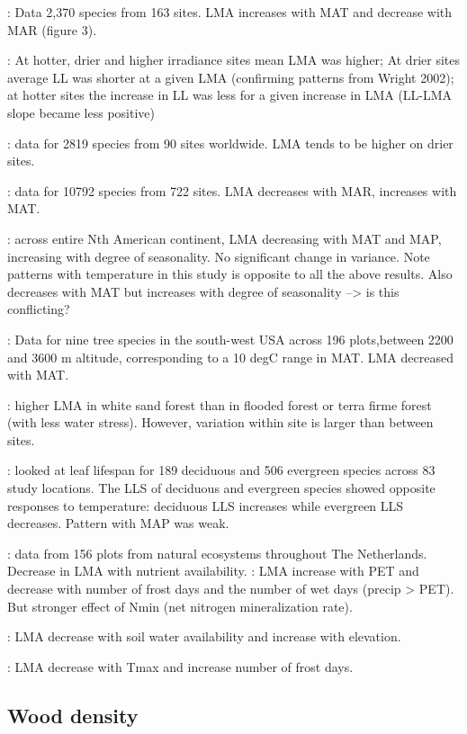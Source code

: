 \documentclass[a4paper,11pt]{article}
\begin{document}
\citet{Wright-2004}: Data 2,370 species from 163 sites. LMA increases with MAT and decrease with MAR (figure 3).

\citet{Wright-2005}: At hotter, drier and higher irradiance sites mean LMA was higher; At drier sites average LL was shorter at a given LMA (confirming patterns from Wright 2002); at hotter sites the increase in LL was less for a given increase in LMA (LL-LMA slope became less positive)

\citet{Onoda-2011}: data for 2819 species from 90 sites worldwide. LMA tends to be higher on drier sites.

\citet{Moles-2014}: data for 10792 species from 722 sites. LMA decreases with MAR, increases with MAT.

\citet{Simova-2014}: across entire Nth American continent, LMA decreasing with MAT and MAP, increasing with degree of seasonality. No significant change in variance. Note patterns with temperature in this study is opposite to all the above results. Also decreases with MAT but increases with degree of seasonality --> is this conflicting?

\citet{Laughlin-2012}: Data for nine tree species in the south-west USA across 196 plots,between 2200 and 3600 m altitude, corresponding to a 10 degC range in MAT. LMA decreased with MAT.

\citet{Fortunel-2014}: higher LMA  in white sand forest than in flooded forest or terra firme forest (with less water stress). However, variation within site is larger than between sites.

\citet{vanOmmenKloeke-2012}: looked at leaf lifespan for 189 deciduous and 506 evergreen species across 83 study locations. The LLS of deciduous and evergreen species showed opposite responses to temperature: deciduous LLS increases while evergreen LLS decreases. Pattern with MAP was weak.

\citet{Douma-2011}: data from 156 plots from natural ecosystems throughout The Netherlands.  Decrease in LMA with nutrient availability.
\citet{VanBodegom-2014}: LMA increase with PET and decrease with number of frost days and the number of wet days (precip > PET). But stronger effect of Nmin (net nitrogen mineralization rate).

\citet{Cornwell-2009}: LMA decrease with soil water availability and increase with elevation.

\citet{Maire-2015}: LMA decrease with Tmax and increase number of frost days.


\subsection{Wood density}
\end{document}
